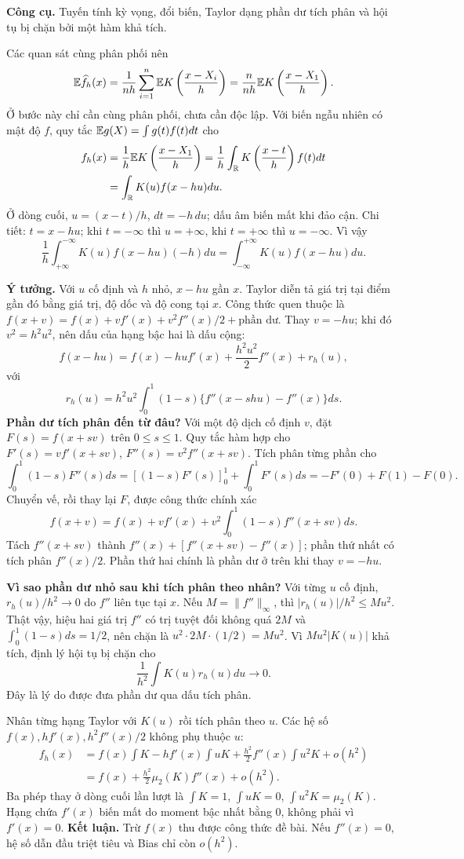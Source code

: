 \textbf{Công cụ.} Tuyến tính kỳ vọng, đổi biến, Taylor dạng phần dư tích phân và hội tụ bị chặn bởi một hàm khả tích.

Các quan sát cùng phân phối nên
\[
\mathbb E\widehat f_h(x)=\frac1{nh}\sum_{i=1}^n
\mathbb E K\left(\frac{x-X_i}{h}\right)
=\frac{n}{nh}\mathbb E K\left(\frac{x-X_1}{h}\right).
\]
Ở bước này chỉ cần cùng phân phối, chưa cần độc lập.
Với biến ngẫu nhiên có mật độ $f$, quy tắc $\mathbb E g(X)=\int g(t)f(t)dt$ cho
\begin{align*}
f_h(x)&=\frac1h\mathbb E K\left(\frac{x-X_1}{h}\right)
=\frac1h\int_{\mathbb R}K\left(\frac{x-t}{h}\right)f(t)dt\\
&=\int_{\mathbb R}K(u)f(x-hu)du.
\end{align*}
Ở dòng cuối, $u=(x-t)/h$, $dt=-h\,du$; dấu âm biến mất khi đảo cận.
Chi tiết: $t=x-hu$; khi $t=-\infty$ thì $u=+\infty$,
khi $t=+\infty$ thì $u=-\infty$. Vì vậy
\[
\frac1h\int_{+\infty}^{-\infty}K(u)f(x-hu)(-h)du
=\int_{-\infty}^{+\infty}K(u)f(x-hu)du.
\]

\textbf{Ý tưởng.} Với $u$ cố định và $h$ nhỏ, $x-hu$ gần $x$.
Taylor diễn tả giá trị tại điểm gần đó bằng giá trị, độ dốc và độ cong tại $x$.
Công thức quen thuộc là
$f(x+v)=f(x)+vf'(x)+v^2f''(x)/2+\text{phần dư}$.
Thay $v=-hu$; khi đó $v^2=h^2u^2$, nên dấu của hạng bậc hai là dấu cộng:
\[
f(x-hu)=f(x)-hu f'(x)+\frac{h^2u^2}{2}f''(x)+r_h(u),
\]
với
\[
r_h(u)=h^2u^2\int_0^1(1-s)\{f''(x-shu)-f''(x)\}ds.
\]
\textbf{Phần dư tích phân đến từ đâu?}
Với một độ dịch cố định $v$, đặt $F(s)=f(x+sv)$ trên $0\leq s\leq1$.
Quy tắc hàm hợp cho $F'(s)=vf'(x+sv)$, $F''(s)=v^2f''(x+sv)$.
Tích phân từng phần cho
\[
\int_0^1(1-s)F''(s)ds
=[(1-s)F'(s)]_0^1+\int_0^1F'(s)ds
=-F'(0)+F(1)-F(0).
\]
Chuyển vế, rồi thay lại $F$, được công thức chính xác
\[
f(x+v)=f(x)+vf'(x)+v^2\int_0^1(1-s)f''(x+sv)ds.
\]
Tách $f''(x+sv)$ thành $f''(x)+[f''(x+sv)-f''(x)]$;
phần thứ nhất có tích phân $f''(x)/2$.
Phần thứ hai chính là phần dư ở trên khi thay $v=-hu$.

\textbf{Vì sao phần dư nhỏ sau khi tích phân theo nhân?}
Với từng $u$ cố định, $r_h(u)/h^2\to0$ do $f''$ liên tục tại $x$.
Nếu $M=\|f''\|_\infty$, thì
$|r_h(u)|/h^2\leq Mu^2$.
Thật vậy, hiệu hai giá trị $f''$ có trị tuyệt đối không quá $2M$ và
$\int_0^1(1-s)ds=1/2$, nên chặn là $u^2\cdot2M\cdot(1/2)=Mu^2$.
Vì $Mu^2|K(u)|$ khả tích, định lý hội tụ bị chặn cho
\[
\frac1{h^2}\int K(u)r_h(u)du\longrightarrow0.
\]
Đây là lý do được đưa phần dư qua dấu tích phân.

Nhân từng hạng Taylor với $K(u)$ rồi tích phân theo $u$.
Các hệ số $f(x),hf'(x),h^2f''(x)/2$ không phụ thuộc $u$:
\begin{align*}
f_h(x)&=f(x)\int K-hf'(x)\int uK
+\frac{h^2}{2}f''(x)\int u^2K+o(h^2)\\
&=f(x)+\frac{h^2}{2}\mu_2(K)f''(x)+o(h^2).
\end{align*}
Ba phép thay ở dòng cuối lần lượt là
$\int K=1$, $\int uK=0$, $\int u^2K=\mu_2(K)$.
Hạng chứa $f'(x)$ biến mất do moment bậc nhất bằng 0, không phải vì $f'(x)=0$.
\textbf{Kết luận.} Trừ $f(x)$ thu được công thức đề bài.
Nếu $f''(x)=0$, hệ số dẫn đầu triệt tiêu và Bias chỉ còn $o(h^2)$.


